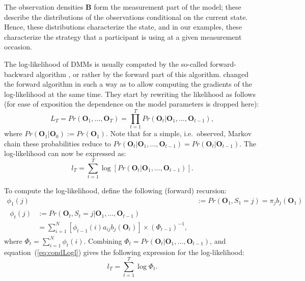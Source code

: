 \documentclass[a4paper,12pt,man,english]{apa} %
\newcommand{\citep}{\cite}
\newcommand{\citet}{\citeA}
\newcommand{\mat}{\mathbf}
\newcommand{\vc}{\mathbf}
\begin{document}
The observation densities $\mat{B}$ form the measurement part of the
model; these describe the distributions of the observations
conditional on the current state. Hence, these distributions
characterize the state, and in our examples, these characterize the
strategy that a participant is using at a given measurement occasion.

The log-likelihood of DMMs is usually computed by the
so-called forward-backward algorithm \citep{Baum1966,Rabiner1989}, or
rather by the forward part of this algorithm.  \citet{Lystig2002}
changed the forward algorithm in such a way as to allow computing the
gradients of the log-likelihood at the same time.  They start by
rewriting the likelihood as follows (for ease of exposition the
dependence on the model parameters is dropped here):
\begin{equation}
	L_{T} = Pr(\vc{O}_{1}, \ldots, \vc{O}_{T}) = \prod_{t=1}^{T}
Pr(\vc{O}_{t}|\vc{O}_{1},
	\ldots, \vc{O}_{t-1}),
	\label{condLike}
\end{equation}
where $Pr(\vc{O}_{1}|\vc{O}_{0}):=Pr(\vc{O}_{1})$. Note that for a
simple, i.e.\ observed, Markov chain these probabilities reduce to
$Pr(\vc{O}_{t}|\vc{O}_{1},\ldots,
\vc{O}_{t-1})=Pr(\vc{O}_{t}|\vc{O}_{t-1})$.
The log-likelihood can now be expressed as:
\begin{equation}
	l_{T} = \sum_{t=1}^{T} \log[Pr(\vc{O}_{t}|\vc{O}_{1}, \ldots,
\vc{O}_{t-1})].
	\label{eq:condLogl}
\end{equation}

To compute the log-likelihood, \citet{Lystig2002} define the following
(forward) recursion:
\begin{align}
	\phi_{1}(j) &:= Pr(\vc{O}_{1}, S_{1}=j) = \pi_{j} b_{j}(\vc{O}_{1})
	\label{eq:fwd1} \\
\begin{split}
	\phi_{t}(j) &:= Pr(\vc{O}_{t}, S_{t}=j|\vc{O}_{1}, \ldots,
\vc{O}_{t-1}) \\
	&= \sum_{i=1}^{N} [\phi_{t-1}(i)a_{ij}b_{j}(\vc{O}_{t})] \times
(\Phi_{t-1})^{-1},
	\label{eq:fwdt}
\end{split}
\end{align}
where $\Phi_{t}=\sum_{i=1}^{N} \phi_{t}(i)$. Combining
$\Phi_{t}=Pr(\vc{O}_{t}|\vc{O}_{1}, \ldots, \vc{O}_{t-1})$, and
equation~(\ref{eq:condLogl}) gives the following expression for the
log-likelihood:
\begin{equation}
	l_{T} = \sum_{t=1}^{T} \log \Phi_{t}.
	\label{eq:logl}
\end{equation}
\end{document}
